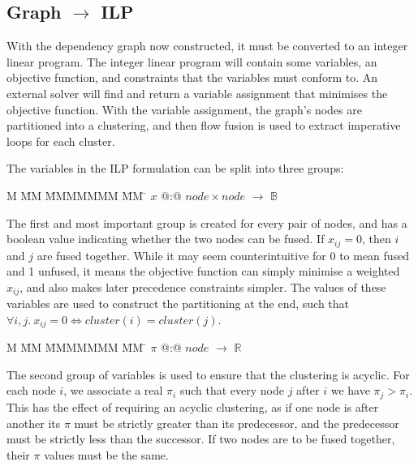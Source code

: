 \subsection{Graph $\to$ ILP}
With the dependency graph now constructed, it must be converted to an integer linear program. The integer linear program will contain some variables, an objective function, and constraints that the variables must conform to. An external solver will find and return a variable assignment that minimises the objective function. With the variable assignment, the graph's nodes are partitioned into a clustering, and then flow fusion\cite{lippmeier2013flow} is used to extract imperative loops for each cluster.

The variables in the ILP formulation can be split into three groups:

\begin{tabbing}
M   \= MM \= MMMMMMM \= MM \= \kill
$x$   \> @:@  \> $node \times node$ \> $\to$ \> $\mathbb{B}$
\end{tabbing}
The first and most important group is created for every pair of nodes, and has a boolean value indicating whether the two nodes can be fused. If $x_{ij} = 0$, then $i$ and $j$ are fused together. While it may seem counterintuitive for 0 to mean fused and 1 unfused, it means the objective function can simply minimise a weighted $x_{ij}$, and also makes later precedence constraints simpler. The values of these variables are used to construct the partitioning at the end, such that $\forall i,j.\ x_{ij} = 0 \iff cluster(i) = cluster(j)$. 

\begin{tabbing}
M   \= MM \= MMMMMMM \= MM \= \kill
$\pi$ \> @:@  \> $node$             \> $\to$ \> $\mathbb{R}$
\end{tabbing}
The second group of variables is used to ensure that the clustering is acyclic. For each node $i$, we associate a real $\pi_i$ such that every node $j$ after $i$ we have $\pi_j > \pi_i$. This has the effect of requiring an acyclic clustering, as if one node is after another its $\pi$ must be strictly greater than its predecessor, and the predecessor must be strictly less than the successor. If two nodes are to be fused together, their $\pi$ values must be the same. 


